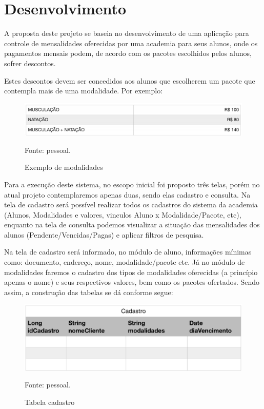 \chapter{Desenvolvimento}\label{cap_intro}
A proposta deste projeto se baseia no desenvolvimento de uma aplicação para controle de mensalidades oferecidas por uma academia para seus alunos, onde os pagamentos mensais podem, de acordo com os pacotes escolhidos pelos alunos, sofrer descontos.

Estes descontos devem ser concedidos aos alunos que escolherem um pacote que contempla mais de uma modalidade. Por exemplo:

\begin{figure}[H]
	\centering
	\includegraphics[width=0.7\linewidth]{images/exModalidades}
	\caption{Exemplo de modalidades}
	Fonte: pessoal.
	\label{fig:exModalidades}
\end{figure}

Para a execução deste sistema, no escopo inicial foi proposto três telas, porém no atual projeto contemplaremos apenas duas, sendo elas cadastro e consulta. Na tela de cadastro será possível realizar todos os cadastros do sistema da academia (Alunos, Modalidades e valores, vinculos Aluno x Modalidade/Pacote, etc), enquanto na tela de consulta podemos visualizar a situação das mensalidades dos alunos (Pendente/Vencidas/Pagas) e aplicar filtros de pesquisa.

Na tela de cadastro será informado, no módulo de aluno, informações mínimas como: documento, endereço, nome, modalidade/pacote etc. Já no módulo de modalidades faremos o cadastro dos tipos de modalidades oferecidas (a princípio apenas o nome) e seus respectivos valores, bem como os pacotes ofertados. Sendo assim, a construção das tabelas se dá conforme segue:

\begin{figure}[H]
	\centering
	\includegraphics[width=0.7\linewidth]{images/tabelaCadastro}
	\caption{Tabela cadastro}
	Fonte: pessoal.
	\label{fig:tabelaCadastro}
\end{figure}


